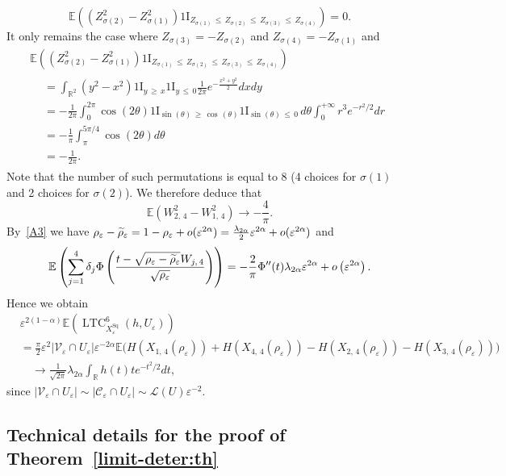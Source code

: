\documentclass[AHL,Unicode,longabstracts,published]{cedram}
\newcommand{\R}{\mathbb{R}}
\newcommand{\E}{\mathbb{E}}
\newcommand{\ind}{{1\!\!\mathrm{I}}}
\newcommand{\eps}{\varepsilon}
\DeclareMathOperator{\LTC}{LTC}
\DeclareMathOperator{\Sq}{Sq}
\newcommand{\calL}{\mathcal{L}}
\newcommand{\calC}{\mathcal{C}}
\newcommand{\calV}{\mathcal{V}}
\let\oldtilde\tilde
\renewcommand*{\tilde}[1]{\mathchoice{\widetilde{#1}}{\widetilde{#1}}{\oldtilde{#1}}{\oldtilde{#1}}}
\begin{document}
\[
\E\left(\left(Z_{\sigma(2)}^2-Z_{\sigma(1)}^2\right)\ind_{Z_{\sigma(1)}\,\le\,Z_{\sigma(2)}\,\le\,Z_{\sigma(3)}\,\le\,Z_{\sigma(4)}}\right)=0.
\]
It only remains the case where $Z_{\sigma(3)}=-Z_{\sigma(2)}$ and $Z_{\sigma(4)}=-Z_{\sigma(1)}$ and
\begin{multline*}
\E\left(\left(Z_{\sigma(2)}^2-Z_{\sigma(1)}^2\right)\ind_{Z_{\sigma(1)}\,\le\,Z_{\sigma(2)}\,\le\,Z_{\sigma(3)}\,\le\,Z_{\sigma(4)}}\right)\\
\begin{aligned}
&=\int_{\R^2}\left(y^2-x^2\right)\ind_{y\,\ge\,x}\ind_{y\,\le\,0}\frac{1}{2\pi}e^{-\frac{x^2+y^2}{2}}dxdy\\
&=-\frac{1}{2\pi}\int_0^{2\pi}\cos(2\theta)\ind_{\sin(\theta)\,\ge\,\cos\,(\theta)}\ind_{\sin(\theta)\,\le\,0}\,d\theta\int_0^{+\infty}r^3e^{-r^2/2}dr\\
&=-\frac{1}{\pi}\int_{\pi}^{5\pi/4}\cos(2\theta)d\theta\\
&=-\frac{1}{2\pi}.
\end{aligned}
\end{multline*}
Note that the number of such permutations is equal to $8$ (4 choices for $\sigma(1)$ and 2 choices for $\sigma(2)$). We therefore deduce that
\[
\E\left(W_{2,\,4}^2-W_{1,\,4}^2\right)
\longrightarrow -\frac{4}{\pi}.
\]
By~\eqref{A3} we have $\rho_\eps-\tilde{\rho}_\eps=1-\rho_\eps+o(\eps^{2\alpha})=\frac{\lambda_{{2\alpha}}}{2}\eps^{2\alpha}+o(\eps^{2\alpha})$ and
\[
\E\left(\sum_{j=1}^{4}\delta_j
\Phi\left(\frac{t-\sqrt{\rho_\eps-\tilde{\rho}_\eps}W_{j,\,4}}{\sqrt{\rho_\eps}}\right)\right)
= -\frac{2}{\pi}\Phi''(t)\lambda_{{2\alpha}}\eps^{2\alpha}+o\left(\eps^{2\alpha}\right).
\]
Hence we obtain
\begin{align*}
&\eps^{2(1-\alpha)}\E\left(\LTC^6_{X_\eps^{\Sq}}(h,U_\eps)\right)\\
&=\frac{\pi}{2}\eps^2\left|\calV_\eps\cap U_\eps\right|
\eps^{-2\alpha}\E\big(H\left(X_{1,\,4}(\rho_\eps)\right)+H\left(X_{4,\,4}(\rho_\eps)\right)-H\left(X_{2,\,4}(\rho_\eps)\right)-H\left(X_{3,\,4}(\rho_\eps)\right)\big)\\
&\quad\longrightarrow\frac{1}{\sqrt{2\pi}}\lambda_{{2\alpha}}\int_{\R}h(t)te^{-t^2/2}dt,
\end{align*}
since $|\calV_\eps\cap U_\eps|\sim |\calC_\eps\cap U_\eps|\sim {\calL}(U)\eps^{-2}$.


\subsection{Technical details for the proof of Theorem~\ref{limit-deter:th}}\label{app:limit-deter:th}
\end{document}
